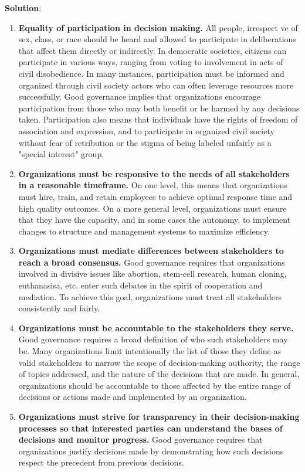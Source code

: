 \documentclass[
]{book}
\newenvironment{solution}{ {\bfseries Solution}:}{}
\begin{document}
\begin{questions}
\begin{solution}
\begin{enumerate}
\item \textbf{Equality of participation in decision making.} All people, irrespect ve of sex, class, or race should be heard and allowed to participate in deliberations that affect them directly or indirectly. In democratic societies, citizens can participate in various ways, ranging from voting to involvement in acts of civil disobedience. In many instances, participation must be informed and organized through civil society actors who can often leverage resources more successfully. Good governance implies that organizations encourage participation from those who may both benefit or be harmed by any decisions taken. Participation also means that individuals have the rights of freedom of association and expression, and to participate in organized civil society without fear of retribution or the stigma of being labeled unfairly as a "special interest" group.
\item \textbf{Organizations must be responsive to the needs of all stakeholders in a reasonable timeframe.} On one level, this means that organizations must hire, train, and retain employees to achieve optimal response time and high quality outcomes. On a more general level, organizations must ensure that they have the capacity, and in some cases the autonomy, to implement changes to structure and management systems to maximize efficiency.
\item \textbf{Organizations must mediate differences between stakeholders to reach a broad consensus.} Good governance requires that organizations involved in divisive issues like abortion, stem-cell research, human cloning, euthanasisa, etc. enter such debates in the spirit of cooperation and mediation. To achieve this goal, organizations must treat all stakeholders consistently and fairly.
\item \textbf{Organizations must be accountable to the stakeholders they serve.} Good governance requires a broad definition of who such stakeholders may be. Many organizations limit intentionally the list of those they define as valid stakeholders to narrow the scope of decision-making authority, the range of topics addressed, and the nature of the decisions that are made. In general, organizations should be accountable to those affected by the entire range of decisions or actions made and implemented by an organization.
\item \textbf{Organizations must strive for transparency in their decision-making processes so that interested parties can understand the bases of decisions and monitor progress.} Good governance requires that organizations justify decisions made by demonstrating how such decisions respect the precedent from previous decisions.

\end{enumerate}
\end{solution}
\end{questions}
\end{document}

